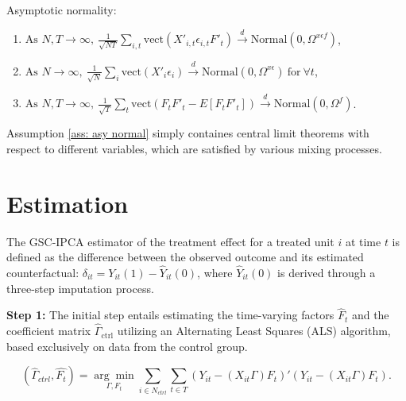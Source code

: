 \documentclass[12pt]{article}
\begin{document}
\begin{assumption}
Asymptotic normality:
\begin{enumerate}
\renewcommand*\labelenumi{(\theenumi)}
\item $\text{As } N, T \to \infty, \: \frac{1}{\sqrt{NT}} \sum_{i,t} \text{vect}\left( X'_{i,t} \epsilon_{i,t} F'_{t} \right) \xrightarrow{d} \text{Normal} \left(0, \Omega^{x\epsilon f} \right)$,
\item $\text{As } N \to \infty, \: \frac{1}{\sqrt{N}} \sum_{i} \text{vect}\left( X'_{i} \epsilon_{i} \right) \xrightarrow{d} \text{Normal} \left(0, \Omega^{x\epsilon} \right) \: \text{for} \: \forall t$,
\item $\text{As } N, T \to \infty, \: \frac{1}{\sqrt{T}} \sum_{t} \text{vect}\left( F_{t}F'_{t} - E[F_{t}F'_{t}] \right) \xrightarrow{d} \text{Normal} \left(0, \Omega^{f} \right)$.
\end{enumerate}
\label{ass: asy normal}
\end{assumption}

Assumption \ref{ass: asy normal} simply containes central limit theorems with respect to different variables, which are satisfied by various mixing processes.

\section{Estimation}
\label{sec: estimation}
The GSC-IPCA estimator of the treatment effect for a treated unit $i$ at time $t$ is defined as the difference between the observed outcome and its estimated counterfactual: $\delta_{it} = Y_{it}(1) - \hat{Y}_{it}(0)$, where $\hat{Y}_{it}(0)$ is derived through a three-step imputation process.

\textbf{Step 1:} The initial step entails estimating the time-varying factors $\hat{F}_t$ and the coefficient matrix $\hat{\Gamma}_{\text{ctrl}}$ utilizing an Alternating Least Squares (ALS) algorithm, based exclusively on data from the control group.

\begin{equation}
(\hat{\Gamma}_{ctrl}, \hat{F_t}) = \underset{\Gamma, F_t}{\arg\min} \sum_{i \in N_{ctrl}} \sum_{t \in T}\left( Y_{it} - (X_{it}\Gamma) F_{t} \right)'\left( Y_{it} - (X_{it}\Gamma) F_{t} \right).
\tag{3}
\label{eq: optimization}
\end{equation}
\end{document}
